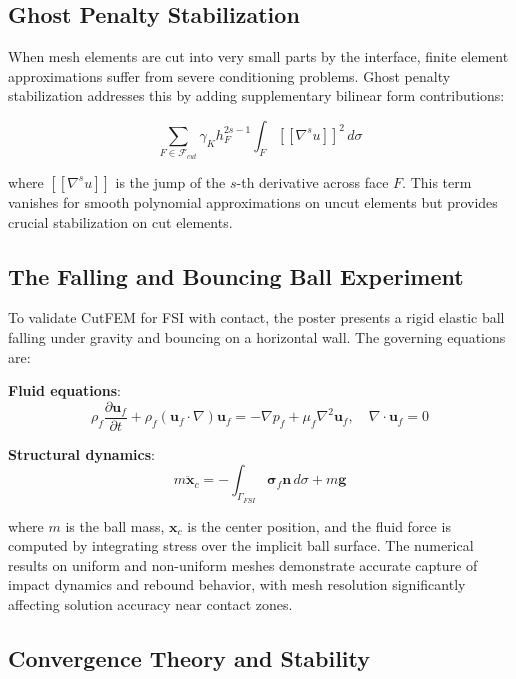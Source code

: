 ﻿\documentclass[a4paper,11pt]{article}
\theoremstyle{definition}
\begin{document}
\subsection{Ghost Penalty Stabilization}

When mesh elements are cut into very small parts by the interface, finite element approximations suffer from severe conditioning problems. Ghost penalty stabilization addresses this by adding supplementary bilinear form contributions:

\begin{equation}
\sum_{F \in \mathcal{F}_{cut}} \gamma_K h_F^{2s-1} \int_F [\![\nabla^s u]\!]^2 \, d\sigma
\end{equation}

where $[\![\nabla^s u]\!]$ is the jump of the $s$-th derivative across face $F$. This term vanishes for smooth polynomial approximations on uncut elements but provides crucial stabilization on cut elements.

\subsection{The Falling and Bouncing Ball Experiment}

To validate CutFEM for FSI with contact, the poster presents a rigid elastic ball falling under gravity and bouncing on a horizontal wall. The governing equations are:

\textbf{Fluid equations}:
\begin{equation}
\rho_f \frac{\partial \mathbf{u}_f}{\partial t} + \rho_f (\mathbf{u}_f \cdot \nabla) \mathbf{u}_f = -\nabla p_f + \mu_f \nabla^2 \mathbf{u}_f, \quad \nabla \cdot \mathbf{u}_f = 0
\end{equation}

\textbf{Structural dynamics}:
\begin{equation}
m \ddot{\mathbf{x}}_c = -\int_{\Gamma_{FSI}} \boldsymbol{\sigma}_f \mathbf{n} \, d\sigma + m\mathbf{g}
\end{equation}

where $m$ is the ball mass, $\mathbf{x}_c$ is the center position, and the fluid force is computed by integrating stress over the implicit ball surface. The numerical results on uniform and non-uniform meshes demonstrate accurate capture of impact dynamics and rebound behavior, with mesh resolution significantly affecting solution accuracy near contact zones.

\subsection{Convergence Theory and Stability}
\end{document}
